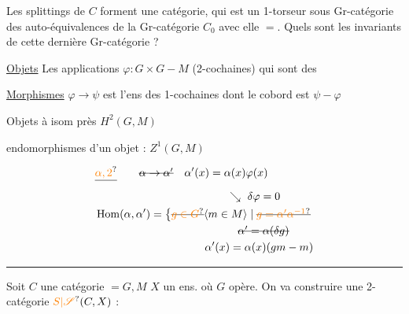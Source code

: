 
 Les splittings de $C$ forment une catégorie,
qui est un 1-torseur sous Gr-catégorie des auto-équivalences de la Gr-catégorie $C_0$ avec elle $=$.
Quels sont les invariants de cette dernière
Gr-catégorie ?

\uline{Objets} Les applications $\varphi:G\times G\mathbin{-}M$ (2-cochaines)
qui sont des 

\uline{Morphismes} $\varphi\to\psi$ est l'ens des 1-cochaines
dont le cobord est $\psi-\varphi$

Objets à isom près \quad $H^2(G,M)$

endomorphismes d'un objet : $Z^1(G,M)$ \deleted{$\unsure{=}$}

\[
\begin{aligned}
&\deleted{\unsure{\alpha,2}}\qquad\deleted{\alpha\to\alpha'}\quad\alpha'(x)=\alpha(x)\varphi(x)\\
&\hspace{12em}\searrow\ \delta\varphi=0\\
&\operatorname{Hom}(\alpha,\alpha')=\bigl\{\deleted{\unsure{g\in G}}\inserted{m\in M}\mid\deleted{\unsure{g=\alpha'\alpha^{-1}}}\\
&\hspace{13em}\deleted{\alpha'=\alpha(\delta g)}\\
&\hspace{10em}\alpha'(x)=\alpha(x)(gm-m)
\end{aligned}
\]

\noindent\rule{.45\linewidth}{.4pt}

Soit $C$ une catégorie   $=G,M$
$X$ un ens. où $G$ opère. On va construire une
2-catégorie $\unsure{S|\mathscr{S}}(C,X)$ :

